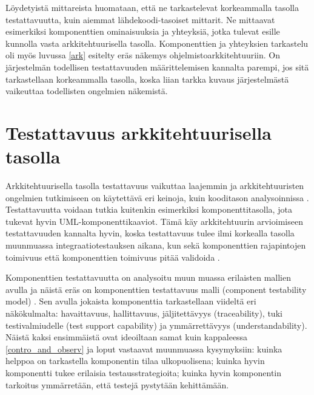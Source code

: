\documentclass[finnish]{tktltiki2}
\theoremstyle{definition}
\theoremstyle{remark}
\begin{document}


 
Löydetyistä mittareista huomataan, että ne tarkastelevat korkeammalla tasolla testattavuutta, kuin aiemmat lähdekoodi-tasoiset mittarit. Ne mittaavat esimerkiksi komponenttien ominaisuuksia ja yhteyksiä, jotka tulevat esille kunnolla vasta arkkitehtuurisella tasolla. Komponenttien ja yhteyksien tarkastelu oli myös luvussa \ref{ark} esitelty eräs näkemys ohjelmistoarkkitehtuuriin. On järjestelmän todellisen testattavuuden määrittelemisen kannalta parempi, jos sitä tarkastellaan korkeammalla tasolla, koska liian tarkka kuvaus järjestelmästä vaikeuttaa todellisten ongelmien näkemistä.  

\section{Testattavuus arkkitehtuurisella tasolla}

Arkkitehtuurisella tasolla testattavuus vaikuttaa laajemmin ja arkkitehtuuristen ongelmien tutkimiseen on käytettävä eri keinoja, kuin kooditason analysoinnissa \citep[s. 186]{kazman_case_2015}. Testattavuutta voidaan tutkia kuitenkin esimerkiksi komponenttitasolla, jota tukevat hyvin UML-komponenttikaaviot. Tämä käy arkkitehtuurin arvioimiseen testattavuuden kannalta hyvin, koska testattavuus tulee ilmi korkealla tasolla muunmuassa integraatiotestauksen aikana, kun sekä komponenttien rajapintojen toimivuus että komponenttien toimivuus pitää validoida \citep[s. 65]{Eickelmann:1996:MOS:243327.243602}. 

Komponenttien testattavuutta on analysoitu muun muassa erilaisten mallien avulla ja näistä eräs on komponenttien testattavuus malli (component testability model) \citep[s. 6]{gao_component_2005}. Sen avulla jokaista komponenttia tarkastellaan viideltä eri näkökulmalta: havaittavuus, hallittavuus, jäljitettävyys (traceability), tuki testivalmiudelle (test support capability) ja ymmärrettävyys (understandability). Näistä kaksi ensimmäistä ovat ideoiltaan samat kuin kappaleessa \ref{contro_and_observ} ja loput vastaavat muunmuassa kysymyksiin: kuinka helppoa on tarkastella komponentin tilaa ulkopuolisena; kuinka hyvin komponentti tukee erilaisia testausstrategioita; kuinka hyvin komponentin tarkoitus ymmärretään, että testejä pystytään kehittämään.
\end{document}
